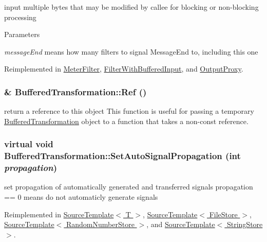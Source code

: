 input multiple bytes that may be modified by callee for blocking or non-\/blocking processing 
\begin{DoxyParams}{Parameters}
\item[{\em messageEnd}]means how many filters to signal MessageEnd to, including this one \end{DoxyParams}


Reimplemented in \hyperlink{class_meter_filter_a03c8af7442aa844e83e4c45397373f14}{MeterFilter}, \hyperlink{class_filter_with_buffered_input_abc7a44af560a17d30a48651683e18e6e}{FilterWithBufferedInput}, and \hyperlink{class_output_proxy_a0b7247fde67865b260d55763e14fdfa5}{OutputProxy}.\hypertarget{class_buffered_transformation_a25686ebe4c3ba26e7eeaae1dcd4d4215}{
\subsubsection[{Ref}]{\& BufferedTransformation::Ref ()}}
\label{class_buffered_transformation_a25686ebe4c3ba26e7eeaae1dcd4d4215}


return a reference to this object This function is useful for passing a temporary \hyperlink{class_buffered_transformation}{BufferedTransformation} object to a function that takes a non-\/const reference. \hypertarget{class_buffered_transformation_ae77dc2fddb3ff142effb00eff3217581}{
\subsubsection[{SetAutoSignalPropagation}]{\setlength{\rightskip}{0pt plus 5cm}virtual void BufferedTransformation::SetAutoSignalPropagation (int {\em propagation})}}
\label{class_buffered_transformation_ae77dc2fddb3ff142effb00eff3217581}


set propagation of automatically generated and transferred signals propagation == 0 means do not automaticly generate signals 

Reimplemented in \hyperlink{class_source_template_af7f891477e9fcea66954f848b86de0a2}{SourceTemplate$<$ T $>$}, \hyperlink{class_source_template_af7f891477e9fcea66954f848b86de0a2}{SourceTemplate$<$ FileStore $>$}, \hyperlink{class_source_template_af7f891477e9fcea66954f848b86de0a2}{SourceTemplate$<$ RandomNumberStore $>$}, and \hyperlink{class_source_template_af7f891477e9fcea66954f848b86de0a2}{SourceTemplate$<$ StringStore $>$}.


